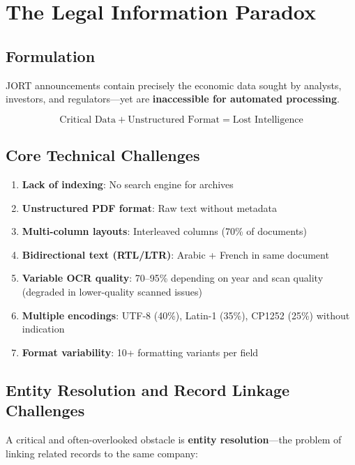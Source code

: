\documentclass[12pt,a4paper]{report}
\begin{document}
\section{The Legal Information Paradox}

\subsection{Formulation}

JORT announcements contain precisely the economic data sought by analysts, investors, and regulators—yet are \textbf{inaccessible for automated processing}.

$$\text{Critical Data} + \text{Unstructured Format} = \text{Lost Intelligence}$$

\subsection{Core Technical Challenges}

\begin{enumerate}
    \item \textbf{Lack of indexing}: No search engine for archives
    \item \textbf{Unstructured PDF format}: Raw text without metadata
    \item \textbf{Multi-column layouts}: Interleaved columns (70\% of documents)
    \item \textbf{Bidirectional text (RTL/LTR)}: Arabic + French in same document
    \item \textbf{Variable OCR quality}: 70--95\% depending on year and scan quality (degraded in lower-quality scanned issues)
    \item \textbf{Multiple encodings}: UTF-8 (40\%), Latin-1 (35\%), CP1252 (25\%) without indication
    \item \textbf{Format variability}: 10+ formatting variants per field
\end{enumerate}

\subsection{Entity Resolution and Record Linkage Challenges}

A critical and often-overlooked obstacle is \textbf{entity resolution}—the problem of linking related records to the same company:
\end{document}

